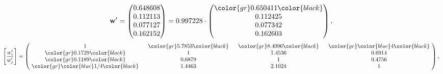 \begin{example}
\begin{equation*}
\mathbf{w}^{\prime} =
\begin{pmatrix}
0.648608\\
0.112113\\
0.077127\\
0.162152
\end{pmatrix} =
0.997228\cdot
\begin{pmatrix}
\color{gr} 0.650411\color{black} \\
0.112425\\
0.077342\\
0.162603
\end{pmatrix},
\end{equation*}
\begin{equation*}
\left[ \frac{{w}^{\prime}_i}{{w}^{\prime}_j} \right] =
\begin{pmatrix}
$\,\,$ 1 $\,\,$ & $\,\,$\color{gr} 5.7853\color{black} $\,\,$ & $\,\,$\color{gr} 8.4096\color{black} $\,\,$ & $\,\,$\color{gr} \color{blue} 4\color{black} $\,\,$ \\
$\,\,$\color{gr} 0.1729\color{black} $\,\,$ & $\,\,$ 1 $\,\,$ & $\,\,$1.4536$\,\,$ & $\,\,$0.6914  $\,\,$ \\
$\,\,$\color{gr} 0.1189\color{black} $\,\,$ & $\,\,$0.6879$\,\,$ & $\,\,$ 1 $\,\,$ & $\,\,$0.4756 $\,\,$ \\
$\,\,$\color{gr} \color{blue}  1/4\color{black} $\,\,$ & $\,\,$1.4463$\,\,$ & $\,\,$2.1024$\,\,$ & $\,\,$ 1  $\,\,$ \\
\end{pmatrix},
\end{equation*}
\end{example}
\newpage
